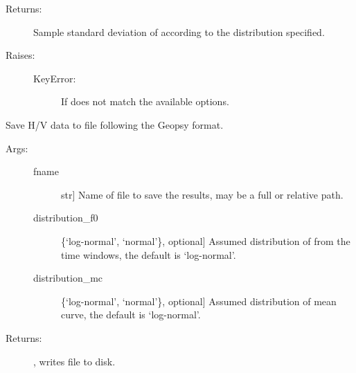 \documentclass[letterpaper,10pt,english,openany,oneside]{sphinxmanual}
\begin{document}
\begin{fulllineitems}
\begin{fulllineitems}
\begin{description}
\begin{description}
\end{description}

\item[{Returns:}] \leavevmode
Sample standard deviation of  according to the 
distribution specified.

\item[{Raises:}] \leavevmode\begin{description}
\item[{KeyError:}] \leavevmode
If  does not match the available options.

\end{description}

\end{description}

\end{fulllineitems}


\begin{fulllineitems}
\label{\detokenize{index:hvsrpy.Hvsr.to_file_like_geopsy}}
Save H/V data to file following the Geopsy format.
\begin{description}
\item[{Args:}] \leavevmode\begin{description}
\item[{fname}] \leavevmode{[}str{]}
Name of file to save the results, may be a full or
relative path.

\item[{distribution\_f0}] \leavevmode{[}\{‘log-normal’, ‘normal’\}, optional{]}
Assumed distribution of  from the time windows, the
default is ‘log-normal’.

\item[{distribution\_mc}] \leavevmode{[}\{‘log-normal’, ‘normal’\}, optional{]}
Assumed distribution of mean curve, the default is
‘log-normal’.

\end{description}

\item[{Returns:}] \leavevmode
{}, writes file to disk.

\end{description}

\end{fulllineitems}


\end{fulllineitems}
\end{document}

